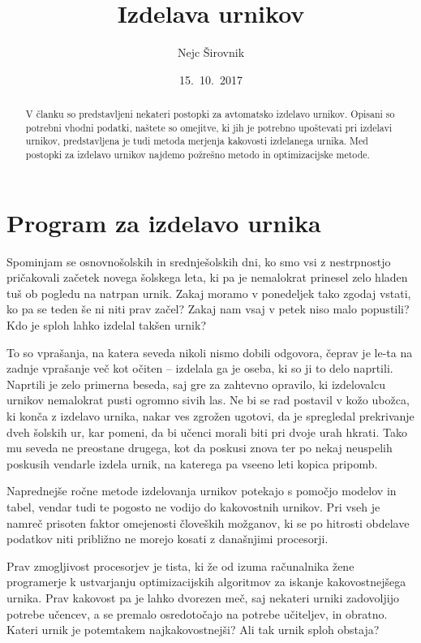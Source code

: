 \documentclass[10pt, a4paper]{article}
\title{Izdelava urnikov}
\author{Nejc Širovnik}
\date{15.\ 10.\ 2017}
\begin{document}
\maketitle

\begin{abstract}
V članku so predstavljeni nekateri postopki za avtomatsko izdelavo urnikov. Opisani so
potrebni vhodni podatki, naštete so omejitve, ki jih je potrebno upoštevati pri izdelavi
urnikov, predstavljena je tudi metoda merjenja kakovosti izdelanega urnika. Med postopki
za izdelavo urnikov najdemo požrešno metodo in optimizacijske metode.
\end{abstract}

\section{Program za izdelavo urnika}

Spominjam se osnovnošolskih in srednješolskih dni, ko smo vsi z nestrpnostjo pričakovali
začetek novega šolskega leta, ki pa je nemalokrat prinesel zelo hladen tuš ob pogledu na
natrpan urnik. Zakaj moramo v ponedeljek tako zgodaj vstati, ko pa se teden še ni niti
prav začel? Zakaj nam vsaj v petek niso malo popustili? Kdo je sploh lahko izdelal
takšen urnik?

To so vprašanja, na katera seveda nikoli nismo dobili odgovora, čeprav je le-ta na zadnje
vprašanje več kot očiten -- izdelala ga je oseba, ki so ji to delo naprtili. Naprtili je
zelo primerna beseda, saj gre za zahtevno opravilo, ki izdelovalcu urnikov nemalokrat
pusti ogromno sivih las. Ne bi se rad postavil v kožo ubožca, ki konča z izdelavo urnika,
nakar ves zgrožen ugotovi, da je spregledal prekrivanje dveh šolskih ur, kar pomeni, da
bi učenci morali biti pri dvoje urah hkrati. Tako mu seveda ne preostane drugega, kot da
poskusi znova ter po nekaj neuspelih poskusih vendarle izdela urnik, na katerega pa vseeno
leti kopica pripomb.

Naprednejše ročne metode izdelovanja urnikov potekajo s pomočjo modelov in tabel, vendar
tudi te pogosto ne vodijo do kakovostnih urnikov. Pri vseh je namreč prisoten faktor
omejenosti človeških možganov, ki se po hitrosti obdelave podatkov niti približno ne
morejo kosati z današnjimi procesorji.

Prav zmogljivost procesorjev je tista, ki že od izuma računalnika žene programerje k
ustvarjanju optimizacijskih algoritmov za iskanje kakovostnejšega urnika. Prav kakovost
pa je lahko dvorezen meč, saj nekateri urniki zadovoljijo potrebe učencev, a se premalo
osredotočajo na potrebe učiteljev, in obratno. Kateri urnik je potemtakem najkakovostnejši?
Ali tak urnik sploh obstaja?
\end{document}
